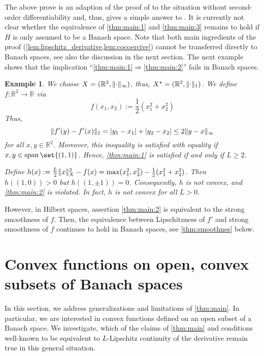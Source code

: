 \documentclass[
	english
]{scrartcl}
\numberwithin{equation}{section} %
\let\cite\parencite
\DeclarePairedDelimiter\abs{\lvert}{\rvert}
\DeclarePairedDelimiter\norm{\lVert}{\rVert}
\newcommand\R{\mathbb{R}}
\newcommand{\dualspace}{^\star}
\newtheorem{example}[theorem]{Example}
\begin{document}
The above prove is an adaption of the proof of
\cite[Theorem~3.3]{BauschkeCombettes2009}
to the situation without second-order differentiability
and, thus, gives a simple answer to \cite[Remark~3.5]{BauschkeCombettes2009}.
It is currently not clear whether the equivalence
of \ref{thm:main:1} and \ref{thm:main:3} remains to hold
if $H$ is only assumed to be a Banach space.
Note that both main ingredients of the proof (\cref{lem:lipschitz_derivative,lem:cocoercive})
cannot be transferred directly to Banach spaces, see also the discussion in the next section.
The next example shows
that the implication ``\ref{thm:main:1}$\Rightarrow$\ref{thm:main:2}'' fails in Banach spaces.
\begin{example}
	\label{ex:banach_lipschitz_2}
	We choose $X = (\R^2, \norm{\cdot}_\infty)$,
	thus, $X\dualspace = (\R^2, \norm{\cdot}_1)$.
	We define $f \colon \R^2 \to \R$ via
	\begin{equation*}
		f(x_1, x_2) := \frac12 (x_1^2 + x_2^2)
	\end{equation*}
	Thus,
	\begin{equation*}
		\norm{f'(y) - f'(x)}_1
		=  \abs{y_1 - x_1} + \abs{y_2 - x_2}
		\le
		2\norm{ y - x }_\infty
	\end{equation*}
	for all $x,y \in \R^2$.
	Moreover,
	this inequality is satisfied with equality if $x,y\in \operatorname{span}\set{(1,1)}$.
	Hence, \ref{thm:main:1} is satisfied if and only if $L \ge 2$.

	Define $h(x):=\frac L2 \norm{x}_X^2 - f(x) = \max(x_1^2,x_2^2)- \frac12 (x_1^2 + x_2^2)$.
	Then $h( (1,0)) >0$ but $h( (1,\pm1))=0$. Consequently, $h$ is not convex, and  \ref{thm:main:2} is violated.
	In fact, $h$ is not convex for all $L>0$.
\end{example}
However,
in Hilbert spaces,
assertion
\ref{thm:main:2}
is equivalent to the
strong smoothness of $f$.
Then, the equivalence between Lipschitzness of $f'$
and strong smoothness of $f$
continues to hold in Banach spaces,
see \cref{thm:smoothnes} below.

\section{Convex functions on open, convex subsets of Banach spaces}
\label{sec:gen_and_lim}
In this section, we address generalizations and limitations
of \cref{thm:main}.
In particular, we are interested in convex functions defined on an open subset of a Banach space.
We investigate, which of the claims of \cref{thm:main} and conditions well-known to be equivalent to $L$-Lipschitz continuity of
the derivative remain true in this general situation.
\end{document}
